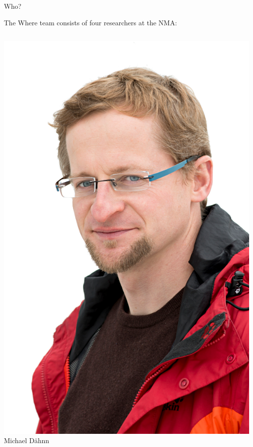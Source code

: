 \documentclass[ignorenonframetext,12pt,t]{beamer}
\begin{document}
\begin{frame}{Who?}

  The Where team consists of four researchers at the NMA:
  
\begin{columns}[c]
    \begin{center}
      \includegraphics[width=\linewidth]{figure/michael} \\
      Michael Dähnn
    \end{center}


\end{columns}
\end{frame}
\end{document}
